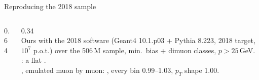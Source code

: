 \documentclass[aspectratio=169,10pt]{beamer}
\begin{document}
\begin{frame}{Reproducing the 2018 sample}
  \begin{columns}[c]
    \begin{column}{0.64\textwidth}
      \\[0.5mm]
    \end{column}
    \begin{column}{0.34\textwidth}
      \\[1mm]
      \footnotesize
      Ours with the 2018 software (Geant4 10.1.p03 + Pythia 8.223, 2018 target, $10^7$ p.o.t.) over the 506\,M sample, min.\ bias + dimuon classes, $p>25$\,GeV.\\[1.5mm]
      : a flat .\\[1mm]
      , emulated muon by muon: , every bin 0.99--1.03, $p_T$ shape 1.00.
    \end{column}
  \end{columns}
\end{frame}
\end{document}
